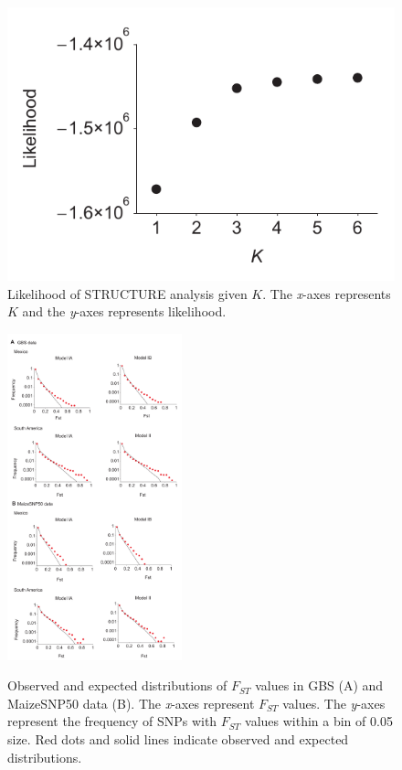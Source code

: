 \begin{figure}[h]
  \begin{center}
    \includegraphics[width=0.4\columnwidth]{fig/kk.pdf}
    \caption{Likelihood of STRUCTURE analysis given $K$.  The \emph{x}-axes represents $K$ and the \emph{y}-axes represents likelihood.}
    \label{supp:struct}
  \end{center}
\end{figure}

\begin{figure}[h]   
  \begin{center}
   \vspace{-0mm}
   \includegraphics[width=0.45\textwidth]{fig/Fig5}
   \renewcommand{\baselinestretch}{0.9}
   \vspace{-3mm}
   \caption{Observed and expected distributions of $F_{ST}$ values in GBS (A) and MaizeSNP50 data (B).  The \emph{x}-axes represent $F_{ST}$ values.  The \emph{y}-axes represent the frequency of SNPs with $F_{ST}$ values within a bin of 0.05 size.  Red dots and solid lines indicate observed and expected distributions. 
   }
\vspace{-6mm}
    \label{FstDist}
  \end{center}
\end{figure}

